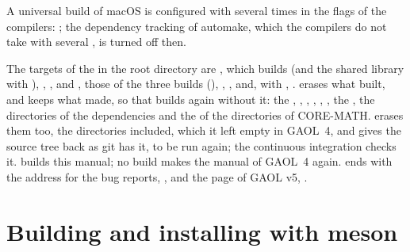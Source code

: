 \medskip
A universal build of
macOS is configured with  several times in the flags of the
compilers: ;
the dependency tracking of automake, which the compilers do not take with
several , is turned off then.\newinvfive

\medskip
The targets of the  in the root directory are ,
which builds  (and the shared library 
with ), , ,  and
, those of the three builds (),
, ,  and, with
, .  erases what
 built, and keeps what  made, so that 
builds again without it: the , ,
, , ,
, the ,
the  directories of the dependencies and the  of
the directories of CORE-MATH.  erases them too, the
 directories included, which it left empty in GAOL~4, and gives
the source tree back as git has it,  to be run again; the
continuous integration checks it.\newinvfive{} 
builds this manual; no build makes the manual of GAOL~4 again.
 ends with
the address for the bug reports, , and the page of
GAOL v5, .

\section{Building and installing with meson}\label{sec:install-meson}
%

\begin{cmdshell}
\end{cmdshell}

